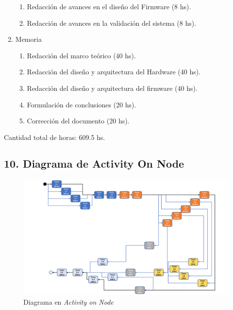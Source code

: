 \documentclass[
11pt, %
codirector, %
]{charter}
\begin{document}
\begin{enumerate}
\begin{enumerate}
		      \item Redacción de avances en el diseño del Firmware (8 hs).
		      \item Redacción de avances en la validación del sistema (8 hs).
	      \end{enumerate}
	\item Memoria
	      \begin{enumerate}
		      \item Redacción del marco teórico (40 hs).
		      \item Redacción del diseño y arquitectura del Hardware (40 hs).
		      \item Redacción del diseño y arquitectura del firmware (40 hs).
		      \item Formulación de conclusiones (20 hs).
		      \item Corrección del documento (20 hs).
	      \end{enumerate}
\end{enumerate}

Cantidad total de horas: 609.5 hs.
\begin{landscape}
	\section{10. Diagrama de Activity On Node}
	\label{sec:AoN}

	\begin{figure}[htpb]
		\centering
		\includegraphics[width=1.28\textwidth]{./Figuras/Aon_cropped.pdf}
		\caption{Diagrama en \textit{Activity on Node}}
		\label{fig:AoN}
	\end{figure}
\end{landscape}
\end{document}
